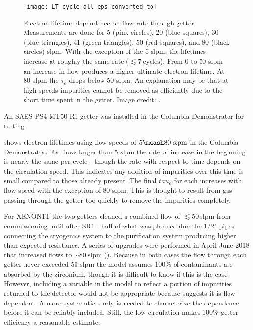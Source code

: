 \begin{figure}
\centering
\texttt{[image: LT\_cycle\_all-eps-converted-to]}
\caption{Electron lifetime dependence on flow rate through getter.  Measurements are done for 5 (pink circles), 20 (blue squares), 30
(blue
triangles), 41 (green triangles), 50 (red squares), and 80 (black circles) slpm.  With the exception of the 5 slpm, the lifetimes increase
at roughly the same rate ($\lesssim 7\ \mathrm{cycles}$).  From 0 to 50 slpm an increase in flow produces a higher ultimate electron
lifetime.  At 80 slpm the $\tau_e$ drops below 50 slpm.  An explanation may be that at high speeds impurities cannot be removed as
efficiently due to the short time spent in the getter.  Image credit: .}
\label{fig:electron_lifetime_model_removal_demonstrator_circ}
\end{figure}

An SAES PS4-MT50-R1 getter was installed in the Columbia Demonstrator for testing.

 shows electron lifetimes using flow speeds of $5 \mdash 80\ \mathrm{slpm}$
in the Columbia Demonstrator.  For flows larger than 5 slpm the rate of increase in the beginning is nearly the same per cycle - though
the rate with respect to time depends on the circulation speed.  This indicates any addition of impurities over this time is small
compared to those already present.  The final $tau_e$ for each increases with flow speed with the exception of 80 slpm.  This is thought
to result from gas passing through the getter too quickly to remove the impurities completely.

For XENON1T the two getters cleaned a combined flow of $\lesssim 50\ \mathrm{slpm}$ from commissioning until after SR1 - half of what was
planned due the 1/2" pipes connecting the cryogenics system to the purification system producing higher than expected resistance.  A
series of
upgrades were performed in April-June 2018 that increased flows to ${\sim} 80\ \mathrm{slpm}$ (\secref{}).  Because in both cases the
flow through each getter never exceeded 50 slpm the model assumes 100\% of contaminants are absorbed by the zirconium, though it is
difficult to know if this is the case.  However, including a variable in the model to reflect a portion of impurities returned
to the detector would not be appropriate because  suggests it is
flow-dependent.  A more systematic study is needed to characterize the dependence before it can be reliably included.  Still, the low
circulation makes 100\% getter efficiency a reasonable estimate.

